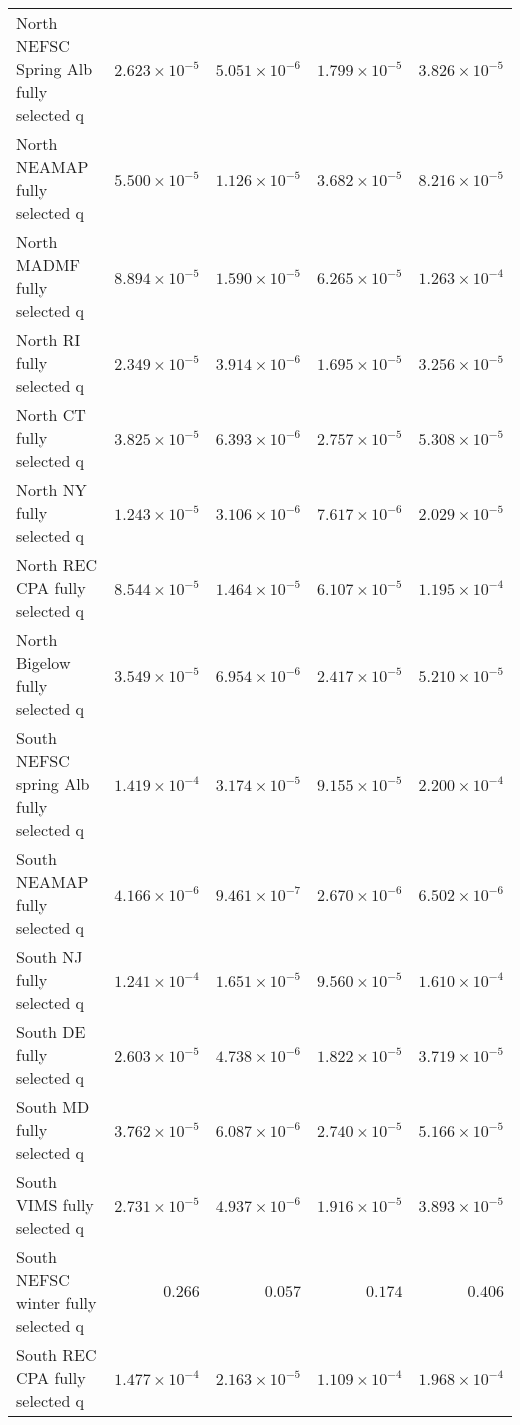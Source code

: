 \documentclass[
]{article}
\begin{document}
\begin{landscape}
\begin{longtable}[t]{lrrrr}
\addlinespace
North NEFSC Spring Alb fully selected q & $2.623\times 10^{-5}$ & $5.051\times 10^{-6}$ & $1.799\times 10^{-5}$ & $3.826\times 10^{-5}$\\
North NEAMAP fully selected q & $5.500\times 10^{-5}$ & $1.126\times 10^{-5}$ & $3.682\times 10^{-5}$ & $8.216\times 10^{-5}$\\
North MADMF fully selected q & $8.894\times 10^{-5}$ & $1.590\times 10^{-5}$ & $6.265\times 10^{-5}$ & $1.263\times 10^{-4}$\\
North RI fully selected q & $2.349\times 10^{-5}$ & $3.914\times 10^{-6}$ & $1.695\times 10^{-5}$ & $3.256\times 10^{-5}$\\
North CT fully selected q & $3.825\times 10^{-5}$ & $6.393\times 10^{-6}$ & $2.757\times 10^{-5}$ & $5.308\times 10^{-5}$\\
\addlinespace
North NY fully selected q & $1.243\times 10^{-5}$ & $3.106\times 10^{-6}$ & $7.617\times 10^{-6}$ & $2.029\times 10^{-5}$\\
North REC CPA fully selected q & $8.544\times 10^{-5}$ & $1.464\times 10^{-5}$ & $6.107\times 10^{-5}$ & $1.195\times 10^{-4}$\\
North Bigelow fully selected q & $3.549\times 10^{-5}$ & $6.954\times 10^{-6}$ & $2.417\times 10^{-5}$ & $5.210\times 10^{-5}$\\
South NEFSC spring Alb fully selected q & $1.419\times 10^{-4}$ & $3.174\times 10^{-5}$ & $9.155\times 10^{-5}$ & $2.200\times 10^{-4}$\\
South NEAMAP fully selected q & $4.166\times 10^{-6}$ & $9.461\times 10^{-7}$ & $2.670\times 10^{-6}$ & $6.502\times 10^{-6}$\\
\addlinespace
South NJ fully selected q & $1.241\times 10^{-4}$ & $1.651\times 10^{-5}$ & $9.560\times 10^{-5}$ & $1.610\times 10^{-4}$\\
South DE fully selected q & $2.603\times 10^{-5}$ & $4.738\times 10^{-6}$ & $1.822\times 10^{-5}$ & $3.719\times 10^{-5}$\\
South MD fully selected q & $3.762\times 10^{-5}$ & $6.087\times 10^{-6}$ & $2.740\times 10^{-5}$ & $5.166\times 10^{-5}$\\
South VIMS fully selected q & $2.731\times 10^{-5}$ & $4.937\times 10^{-6}$ & $1.916\times 10^{-5}$ & $3.893\times 10^{-5}$\\
South NEFSC winter fully selected q & $0.266$ & $0.057$ & $0.174$ & $0.406$\\
\addlinespace
South REC CPA fully selected q & $1.477\times 10^{-4}$ & $2.163\times 10^{-5}$ & $1.109\times 10^{-4}$ & $1.968\times 10^{-4}$\\

\end{longtable}
\end{landscape}
\end{document}
